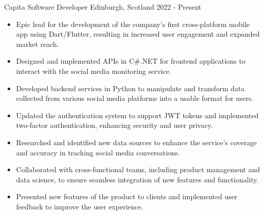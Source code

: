 
  \cventry
    {Capita} %
    {Software Developer} %
    {Edinburgh, Scotland} %
    {2022 - Present} %
    {
        \begin{itemize}
            \item Epic lead for the development of the company's first 
                cross-platform mobile app using Dart/Flutter, resulting in 
                increased user engagement and expanded market reach.
            \item Designed and implemented APIs in C\#.NET for frontend 
                applications to interact with the social media monitoring 
                service.
            \item Developed backend services in Python to manipulate and 
                transform data collected from various social media platforms 
                into a usable format for users.
            \item Updated the authentication system to support JWT tokens and 
                implemented two-factor authentication, enhancing security and 
                user privacy.
            \item Researched and identified new data sources to enhance the 
                service's coverage and accuracy in tracking social media 
                conversations.
            \item Collaborated with cross-functional teams, including product 
                management and data science, to ensure seamless integration 
                of new features and functionality.
            \item Presented new features of the product to clients and 
                implemented user feedback to improve the user experience.
        \end{itemize}
    }
